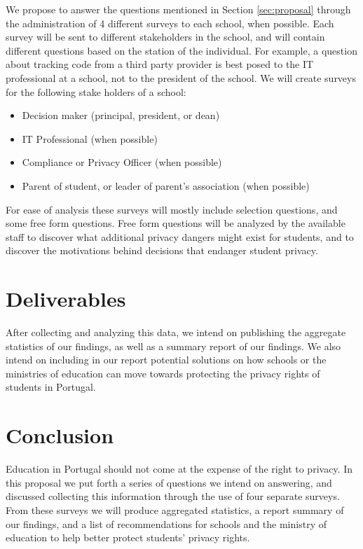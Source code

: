 \documentclass[twoside,twocolumn]{article}
\begin{document}
We propose to answer the questions mentioned in Section \ref{sec:proposal} through the administration of 4 different surveys to each school, when possible. Each survey will be sent to different stakeholders in the school, and will contain different questions based on the station of the individual. For example, a question about tracking code from a third party provider is best posed to the IT professional at a school, not to the president of the school. We will create surveys for the following stake holders of a school:

\begin{itemize}
\itemsep0em
\item Decision maker (principal, president, or dean)
\item IT Professional (when possible)
\item Compliance or Privacy Officer (when possible)
\item Parent of student, or leader of parent's association (when possible)
\end{itemize}

For ease of analysis these surveys will mostly include selection questions, and some free form questions. Free form questions will be analyzed by the available staff to discover what additional privacy dangers might exist for students, and to discover the motivations behind decisions that endanger student privacy.



\section{Deliverables}
\label{sec:deliverables}

After collecting and analyzing this data, we intend on publishing the aggregate statistics of our findings, as well as a summary report of our findings. We also intend on including in our report potential solutions on how schools or the ministries of education can move towards protecting the privacy rights of students in Portugal.

\section{Conclusion}

Education in Portugal should not come at the expense of the right to privacy. In this proposal we put forth a series of questions we intend on answering, and discussed collecting this information through the use of four separate surveys. From these surveys we will produce aggregated statistics, a report summary of our findings, and a list of recommendations for schools and the ministry of education to help better protect students' privacy rights.
\end{document}

